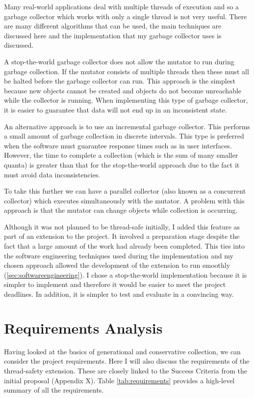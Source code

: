 \documentclass[../diss.tex]{subfiles}
\begin{document}
Many real-world applications deal with multiple threads of execution and so a garbage collector which works with only a single thread is not very useful. There are many different algorithms that can be used, the main techniques are discussed here and the implementation that my garbage collector uses is discussed.

A stop-the-world garbage collector does not allow the mutator to run during garbage collection. If the mutator consists of multiple threads then these must all be halted before the garbage collector can run. This approach is the simplest because new objects cannot be created and objects do not become unreachable while the collector is running. When implementing this type of garbage collector, it is easier to guarantee that data will not end up in an inconsistent state.

An alternative approach is to use an incremental garbage collector. This performs a small amount of garbage collection in discrete intervals. This type is preferred when the software must guarantee response times such as in user interfaces. However, the time to complete a collection (which is the sum of many smaller quanta) is greater than that for the stop-the-world approach due to the fact it must avoid data inconsistencies. 

To take this further we can have a parallel collector (also known as a concurrent collector) which executes simultaneously with the mutator. A problem with this approach is that the mutator can change objects while collection is occurring.

Although it was not planned to be thread-safe initially, I added this feature as part of an extension to the project. It involved a preparation stage despite the fact that a large amount of the work had already been completed. This ties into the software engineering techniques used during the implementation and my chosen approach allowed the development of the extension to run smoothly (\cref{sec:softwareengineering}). I chose a stop-the-world implementation because it is simpler to implement and therefore it would be easier to meet the project deadlines. In addition, it is simpler to test and evaluate in a convincing way.

\section{Requirements Analysis} \label{sec:requirements}

Having looked at the basics of generational and conservative collection, we can consider the project requirements. Here I will also discuss the requirements of the thread-safety extension. These are closely linked to the Success Criteria from the initial proposal (Appendix X). Table \ref{tab:requirements} provides a high-level summary of all the requirements.
\end{document}
